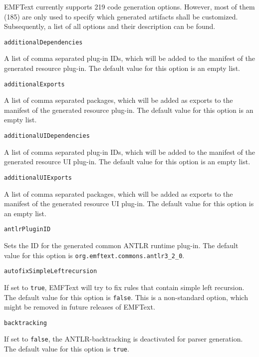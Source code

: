EMFText currently supports 219 code generation options. However, most of them (185) are only used to specify which generated artifacts shall be customized. Subsequently, a list of all options and their description can be found.

\vspace{1cm}\noindent\texttt{additionalDependencies}
\begin{myindentpar}{1cm}
A list of comma separated plug-in IDs, which will be added to the manifest of the generated resource plug-in. The default value for this option is an empty list.
\end{myindentpar}

\noindent\texttt{additionalExports}
\begin{myindentpar}{1cm}
A list of comma separated packages, which will be added as exports to the manifest of the generated resource plug-in. The default value for this option is an empty list.
\end{myindentpar}

\noindent\texttt{additionalUIDependencies}
\begin{myindentpar}{1cm}
A list of comma separated plug-in IDs, which will be added to the manifest of the generated resource UI plug-in. The default value for this option is an empty list.
\end{myindentpar}

\noindent\texttt{additionalUIExports}
\begin{myindentpar}{1cm}
A list of comma separated packages, which will be added as exports to the manifest of the generated resource UI plug-in. The default value for this option is an empty list.
\end{myindentpar}

\noindent\texttt{antlrPluginID}
\begin{myindentpar}{1cm}
Sets the ID for the generated common ANTLR runtime plug-in. The default value for this option is \texttt{org.emftext.commons.antlr3\_2\_0}.
\end{myindentpar}

\noindent\texttt{autofixSimpleLeftrecursion}
\begin{myindentpar}{1cm}
If set to \texttt{true}, EMFText will try to fix rules that contain simple left recursion. The default value for this option is \texttt{false}. This is a non-standard option, which might be removed in future releases of EMFText.
\end{myindentpar}

\noindent\texttt{backtracking}
\begin{myindentpar}{1cm}
If set to \texttt{false}, the ANTLR-backtracking is deactivated for parser generation. The default value for this option is \texttt{true}.
\end{myindentpar}

